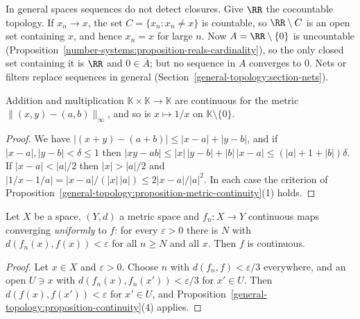 \begin{counterexample}\label{general-topology:counterexample-sequences-insufficient}
In general spaces sequences do not detect closures. Give $\RR$ the cocountable topology. If $x_n \to x$, the set $C = \{x_n : x_n \neq x\}$ is
countable, so $\RR \setminus C$ is an open set containing $x$, and hence $x_n = x$ for large $n$. Now $A = \RR \setminus \{0\}$ is uncountable
(Proposition~\ref{number-systems:proposition-reals-cardinality}), so the only closed set containing it is $\RR$ and $0 \in \overline{A}$; but no
sequence in $A$ converges to $0$. Nets or filters replace sequences in general (Section~\ref{general-topology:section-nets}).
\end{counterexample}

\begin{proposition}\label{general-topology:proposition-arithmetic-continuous}
Addition and multiplication $\mathbb{K} \times \mathbb{K} \to \mathbb{K}$ are continuous for the metric $\|(x, y) - (a, b)\|_\infty$, and so is
$x \mapsto 1/x$ on $\mathbb{K} \setminus \{0\}$.
\end{proposition}

\begin{proof}
We have $|(x + y) - (a + b)| \leq |x - a| + |y - b|$, and if $|x - a|, |y - b| < \delta \leq 1$ then
$|xy - ab| \leq |x|\,|y - b| + |b|\,|x - a| \leq (|a| + 1 + |b|)\delta$. If $|x - a| < |a|/2$ then $|x| > |a|/2$ and
$|1/x - 1/a| = |x - a|/(|x|\,|a|) \leq 2|x - a|/|a|^2$. In each case the criterion of
Proposition~\ref{general-topology:proposition-metric-continuity}(1) holds.
\end{proof}

\begin{proposition}\label{general-topology:proposition-uniform-limit}
Let $X$ be a space, $(Y, d)$ a metric space and $f_n \colon X \to Y$ continuous maps converging \emph{uniformly} to $f$: for every
$\varepsilon > 0$ there is $N$ with $d(f_n(x), f(x)) < \varepsilon$ for all $n \geq N$ and all $x$. Then $f$ is continuous.
\end{proposition}

\begin{proof}
Let $x \in X$ and $\varepsilon > 0$. Choose $n$ with $d(f_n, f) < \varepsilon/3$ everywhere, and an open $U \ni x$ with
$d(f_n(x), f_n(x')) < \varepsilon/3$ for $x' \in U$. Then $d(f(x), f(x')) < \varepsilon$ for $x' \in U$, and
Proposition~\ref{general-topology:proposition-continuity}(4) applies.
\end{proof}

